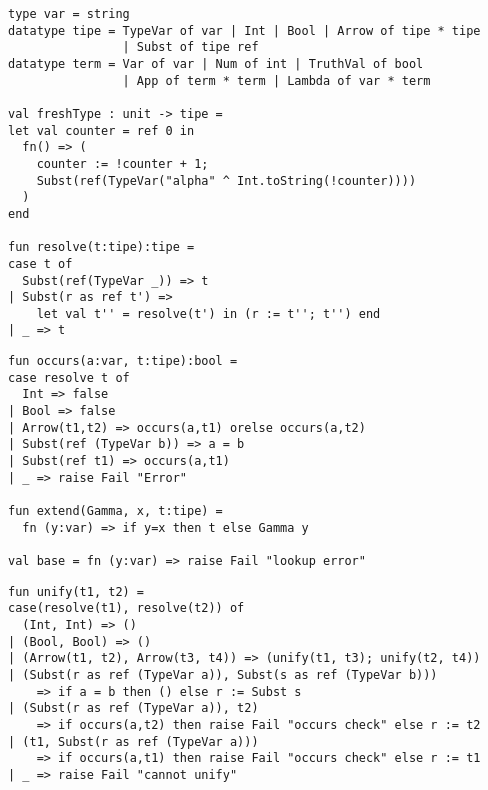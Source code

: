 \documentclass[landscape]{slides}
\begin{document}
\begin{slide}
\color{black}%
\begin{small}
\begin{verbatim}
type var = string
datatype tipe = TypeVar of var | Int | Bool | Arrow of tipe * tipe
                | Subst of tipe ref
datatype term = Var of var | Num of int | TruthVal of bool
                | App of term * term | Lambda of var * term

val freshType : unit -> tipe =
let val counter = ref 0 in
  fn() => (
    counter := !counter + 1;
    Subst(ref(TypeVar("alpha" ^ Int.toString(!counter))))
  )
end

fun resolve(t:tipe):tipe =
case t of
  Subst(ref(TypeVar _)) => t
| Subst(r as ref t') =>
    let val t'' = resolve(t') in (r := t''; t'') end
| _ => t
\end{verbatim}
\end{small}
\end{slide}

\begin{slide}
\color{black}%
\begin{small}
\begin{verbatim}
fun occurs(a:var, t:tipe):bool =
case resolve t of
  Int => false
| Bool => false
| Arrow(t1,t2) => occurs(a,t1) orelse occurs(a,t2)
| Subst(ref (TypeVar b)) => a = b
| Subst(ref t1) => occurs(a,t1)
| _ => raise Fail "Error"

fun extend(Gamma, x, t:tipe) =
  fn (y:var) => if y=x then t else Gamma y

val base = fn (y:var) => raise Fail "lookup error"
\end{verbatim}
\end{small}
\end{slide}

\begin{slide}
\color{black}%
\begin{small}
\begin{verbatim}
fun unify(t1, t2) =
case(resolve(t1), resolve(t2)) of
  (Int, Int) => ()
| (Bool, Bool) => ()
| (Arrow(t1, t2), Arrow(t3, t4)) => (unify(t1, t3); unify(t2, t4))
| (Subst(r as ref (TypeVar a)), Subst(s as ref (TypeVar b)))
    => if a = b then () else r := Subst s
| (Subst(r as ref (TypeVar a)), t2)
    => if occurs(a,t2) then raise Fail "occurs check" else r := t2
| (t1, Subst(r as ref (TypeVar a)))
    => if occurs(a,t1) then raise Fail "occurs check" else r := t1
| _ => raise Fail "cannot unify"
\end{verbatim}
\end{small}
\end{slide}
\end{document}
